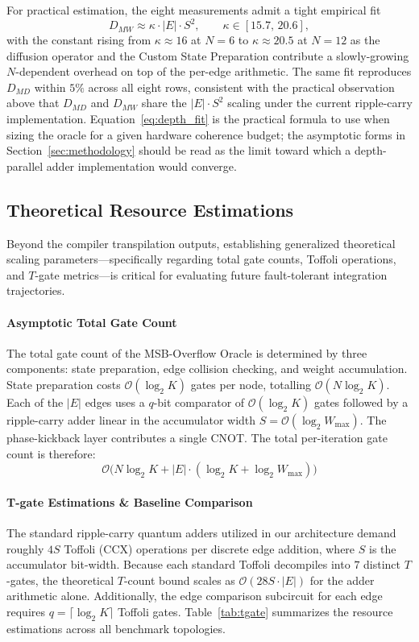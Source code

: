 \documentclass{ieeeaccess}
\begin{document}
For practical estimation, the eight measurements admit a tight empirical fit
\begin{equation}
D_{MW} \approx \kappa \cdot |E| \cdot S^2, \qquad \kappa \in [15.7,\, 20.6],
\label{eq:depth_fit}
\end{equation}
with the constant rising from $\kappa \approx 16$ at $N=6$ to $\kappa \approx 20.5$ at $N=12$ as the diffusion operator and the Custom State Preparation contribute a slowly-growing $N$-dependent overhead on top of the per-edge arithmetic. The same fit reproduces $D_{MD}$ within $5\%$ across all eight rows, consistent with the practical observation above that $D_{MD}$ and $D_{MW}$ share the $|E| \cdot S^2$ scaling under the current ripple-carry implementation. Equation~\eqref{eq:depth_fit} is the practical formula to use when sizing the oracle for a given hardware coherence budget; the asymptotic forms in Section~\ref{sec:methodology} should be read as the limit toward which a depth-parallel adder implementation would converge.

\subsection{Theoretical Resource Estimations}
Beyond the compiler transpilation outputs, establishing generalized theoretical scaling parameters—specifically regarding total gate counts, Toffoli operations, and $T$-gate metrics—is critical for evaluating future fault-tolerant integration trajectories.

\paragraph{Asymptotic Total Gate Count}
The total gate count of the MSB-Overflow Oracle is determined by three components: state preparation, edge collision checking, and weight accumulation. State preparation costs $\mathcal{O}(\log_2 K)$ gates per node, totalling $\mathcal{O}(N \log_2 K)$. Each of the $|E|$ edges uses a $q$-bit comparator of $\mathcal{O}(\log_2 K)$ gates followed by a ripple-carry adder linear in the accumulator width $S = \mathcal{O}(\log_2 W_{\max})$. The phase-kickback layer contributes a single CNOT. The total per-iteration gate count is therefore:
\begin{equation}
\mathcal{O}\big(N \log_2 K + |E| \cdot (\log_2 K + \log_2 W_{\max})\big)
\label{eq:asymptotic_gate}
\end{equation}

\paragraph{T-gate Estimations \& Baseline Comparison}
The standard ripple-carry quantum adders utilized in our architecture demand roughly $4S$ Toffoli (CCX) operations per discrete edge addition, where $S$ is the accumulator bit-width. Because each standard Toffoli decompiles into $7$ distinct $T$-gates, the theoretical $T$-count bound scales as $\mathcal{O}(28S \cdot |E|)$ for the adder arithmetic alone. Additionally, the edge comparison subcircuit for each edge requires $q = \lceil \log_2 K \rceil$ Toffoli gates. Table~\ref{tab:tgate} summarizes the resource estimations across all benchmark topologies.
\end{document}
